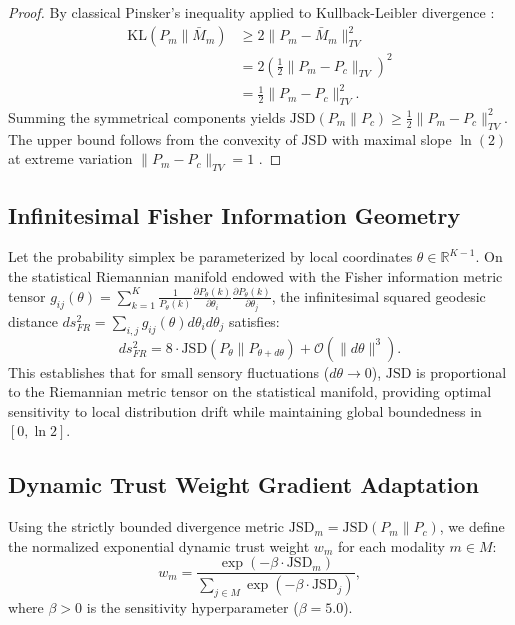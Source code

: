 \documentclass[conference]{IEEEtran}
\begin{document}
\begin{proof}
By classical Pinsker's inequality applied to Kullback-Leibler divergence \cite{lin1991divergence}:
\begin{align}
\mathrm{KL}(P_m \parallel \bar{M}_m) &\ge 2 \|P_m - \bar{M}_m\|_{TV}^2 \nonumber \\
&= 2 \left( \tfrac{1}{2}\|P_m - P_c\|_{TV} \right)^2 \nonumber \\
&= \tfrac{1}{2}\|P_m - P_c\|_{TV}^2.
\end{align}
Summing the symmetrical components yields $\mathrm{JSD}(P_m \parallel P_c) \ge \frac{1}{2} \|P_m - P_c\|_{TV}^2$. The upper bound follows from the convexity of $\mathrm{JSD}$ with maximal slope $\ln(2)$ at extreme variation $\|P_m - P_c\|_{TV} = 1$ \cite{endres2003new}.
\end{proof}

\subsection{Infinitesimal Fisher Information Geometry}
Let the probability simplex be parameterized by local coordinates $\theta \in \mathbb{R}^{K-1}$. On the statistical Riemannian manifold endowed with the Fisher information metric tensor $g_{ij}(\theta) = \sum_{k=1}^K \frac{1}{P_\theta(k)} \frac{\partial P_\theta(k)}{\partial \theta_i} \frac{\partial P_\theta(k)}{\partial \theta_j}$, the infinitesimal squared geodesic distance $ds_{FR}^2 = \sum_{i,j} g_{ij}(\theta) d\theta_i d\theta_j$ satisfies:
\begin{equation}
ds_{FR}^2 = 8 \cdot \mathrm{JSD}(P_\theta \parallel P_{\theta + d\theta}) + \mathcal{O}(\|d\theta\|^3).
\end{equation}
This establishes that for small sensory fluctuations ($d\theta \to 0$), $\mathrm{JSD}$ is proportional to the Riemannian metric tensor on the statistical manifold, providing optimal sensitivity to local distribution drift while maintaining global boundedness in $[0, \ln 2]$.

\subsection{Dynamic Trust Weight Gradient Adaptation}
Using the strictly bounded divergence metric $\mathrm{JSD}_m = \mathrm{JSD}(P_m \parallel P_c)$, we define the normalized exponential dynamic trust weight $w_m$ for each modality $m \in M$:
\begin{equation}
w_m = \frac{\exp(-\beta \cdot \mathrm{JSD}_m)}{\sum_{j \in M} \exp(-\beta \cdot \mathrm{JSD}_j)},
\end{equation}
where $\beta > 0$ is the sensitivity hyperparameter ($\beta = 5.0$).
\end{document}
